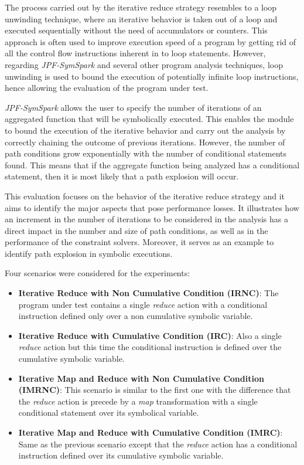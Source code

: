 
The process carried out by the iterative reduce strategy resembles to a loop unwinding technique, where an iterative behavior is taken out of a loop and executed sequentially without the need of accumulators or counters. This approach is often used to improve execution speed of a program by getting rid of all the control flow instructions inherent in to loop statements. However, regarding \textit{JPF-SymSpark} and several other program analysis techniques, loop unwinding is used to bound the execution of potentially infinite loop instructions, hence allowing the evaluation of the program under test.

\textit{JPF-SymSpark} allows the user to specify the number of iterations of an aggregated function that will be symbolically executed. This enables the module to bound the execution of the iterative behavior and carry out the analysis by correctly chaining the outcome of previous iterations. However, the number of path conditions grow exponentially with the number of conditional statements found. This means that if the aggregate function being analyzed has a conditional statement, then it is most likely that a path explosion will occur.

This evaluation focuses on the behavior of the iterative reduce strategy and it aims to identify the major aspects that pose performance losses. It illustrates how an increment in the number of iterations to be considered in the analysis has a direct impact in the number and size of path conditions, as well as in the performance of the constraint solvers. Moreover, it serves as an example to identify path explosion in symbolic executions.


Four scenarios were considered for the experiments:

\begin{itemize}
	\item \textbf{Iterative Reduce with Non Cumulative Condition (IRNC)}: The program under test contains a single \textit{reduce} action with a conditional instruction defined only over a non cumulative symbolic variable.
	\item \textbf{Iterative Reduce with Cumulative Condition (IRC)}: Also a single \textit{reduce} action but this time the conditional instruction is defined over the cumulative symbolic variable.
	\item \textbf{Iterative Map and Reduce with Non Cumulative Condition (IMRNC)}: This scenario is similar to the first one with the difference that the \textit{reduce} action is precede by a \textit{map} transformation with a single conditional statement over its symbolical variable.
	\item \textbf{Iterative Map and Reduce with Cumulative Condition (IMRC)}: Same as the previous scenario except that the \textit{reduce} action has a conditional instruction defined over its cumulative symbolic variable.
\end{itemize}

